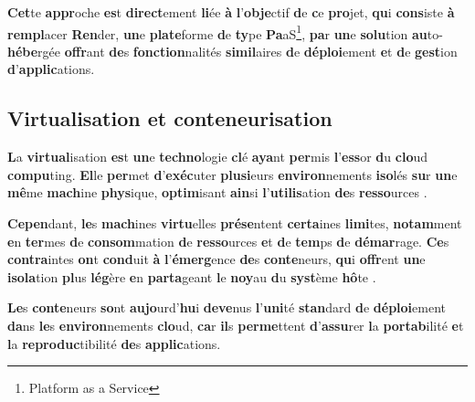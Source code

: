 \documentclass{rapportClass} %
\begin{document}
\textbf{Cet}te \textbf{appr}oche \textbf{es}t \textbf{direct}ement \textbf{li}ée \textbf{à} \textbf{l}’\textbf{obje}ctif \textbf{d}e \textbf{c}e \textbf{pro}jet, \textbf{qu}i
\textbf{cons}iste \textbf{à} \textbf{rempl}acer \textbf{Ren}der, \textbf{un}e \textbf{plate}forme \textbf{d}e \textbf{ty}pe \textbf{Pa}aS\footnote{Platform as a Service}, \textbf{pa}r \textbf{un}e
\textbf{solu}tion \textbf{au}to-\textbf{hébe}rgée \textbf{offr}ant \textbf{de}s \textbf{fonction}nalités \textbf{simil}aires \textbf{d}e
\textbf{déploi}ement \textbf{e}t \textbf{d}e \textbf{gest}ion \textbf{d}’\textbf{applic}ations.

\subsection{Virtualisation et conteneurisation}

\textbf{L}a \textbf{virtual}isation \textbf{es}t \textbf{un}e \textbf{techno}logie \textbf{cl}é \textbf{aya}nt \textbf{per}mis
\textbf{l}’\textbf{ess}or \textbf{d}u \textbf{clo}ud \textbf{compu}ting. \textbf{El}le \textbf{per}met \textbf{d}’\textbf{exéc}uter \textbf{plusi}eurs
\textbf{environ}nements \textbf{iso}lés \textbf{su}r \textbf{un}e \textbf{mê}me \textbf{mach}ine \textbf{phys}ique, \textbf{optim}isant \textbf{ain}si
\textbf{l}’\textbf{utilis}ation \textbf{de}s \textbf{resso}urces \cite{VMware2007}.

\textbf{Cepen}dant, \textbf{le}s \textbf{mach}ines \textbf{virtu}elles \textbf{prése}ntent \textbf{certa}ines \textbf{limi}tes,
\textbf{notam}ment \textbf{e}n \textbf{ter}mes \textbf{d}e \textbf{consom}mation \textbf{d}e \textbf{resso}urces \textbf{e}t \textbf{d}e \textbf{tem}ps \textbf{d}e
\textbf{démar}rage. \textbf{Ce}s \textbf{contra}intes \textbf{on}t \textbf{cond}uit \textbf{à} \textbf{l}’\textbf{émerg}ence \textbf{de}s \textbf{conte}neurs,
\textbf{qu}i \textbf{offr}ent \textbf{un}e \textbf{isola}tion \textbf{pl}us \textbf{lég}ère \textbf{e}n \textbf{parta}geant \textbf{l}e \textbf{noy}au \textbf{d}u
\textbf{syst}ème \textbf{hô}te \cite{Merkel2014}.

\textbf{Le}s \textbf{conte}neurs \textbf{so}nt \textbf{aujo}urd’\textbf{hu}i \textbf{deve}nus \textbf{l}’\textbf{uni}té \textbf{stan}dard \textbf{d}e \textbf{déploi}ement
\textbf{da}ns \textbf{le}s \textbf{environ}nements \textbf{clo}ud, \textbf{ca}r \textbf{il}s \textbf{perme}ttent \textbf{d}’\textbf{assu}rer \textbf{l}a
\textbf{portab}ilité \textbf{e}t \textbf{l}a \textbf{reproduc}tibilité \textbf{de}s \textbf{applic}ations.
\end{document}
